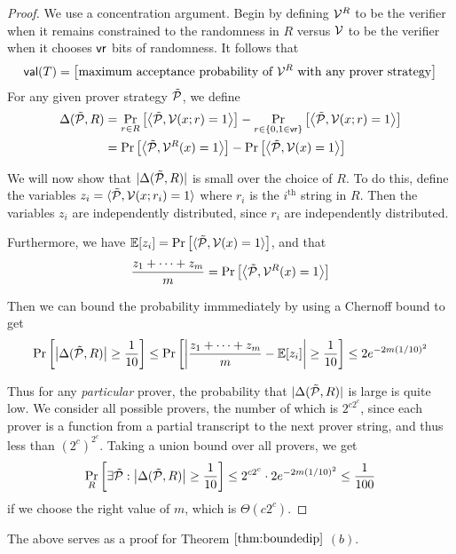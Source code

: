 \begin{proof}
	We use a concentration argument. Begin by defining $\mathcal{V}^R$ to be the verifier when it remains constrained to the randomness in $R$ versus $\mathcal{V}$ to be the verifier when it chooses $\mathsf{vr}$ bits of randomness. It follows that 
	$$\mathsf{val}(T)=\left[\text{maximum acceptance probability of $\mathcal{V}^R$ with any prover strategy}\right]$$
	For any given prover strategy $\tilde{\mathcal{P}}$, we define
	\begin{align*}
		\Delta(\tilde{\mathcal{P}},R)&=\Pr_{r\in R}\left[\left\langle\tilde{\mathcal{P}},\mathcal{V}(x;r)=1\right\rangle\right]-\Pr_{r\in \{0,1\in\mathsf{vr}\}}\left[\left\langle\tilde{\mathcal{P}},\mathcal{V}(x;r)=1\right\rangle\right]\\
		&=\Pr\left[\left\langle\tilde{\mathcal{P}},\mathcal{V}^R(x)=1\right\rangle\right]-\Pr\left[\left\langle\tilde{\mathcal{P}},\mathcal{V}(x)=1\right\rangle\right]
	\end{align*}

	We will now show that $|\Delta(\tilde{\mathcal{P}},R)|$ is small over the choice of $R$. To do this, define the variables $z_i=\langle\tilde{\mathcal{P}},\mathcal{V}(x;r_i)=1\rangle$ where $r_i$ is the $i^\text{th}$ string in $R$. Then the variables $z_i$ are independently distributed, since $r_i$ are independently distributed.
	
	Furthermore, we have $\mathbb{E}[z_i]=\Pr\left[\langle\tilde{\mathcal{P}},\mathcal{V}(x)=1\rangle\right]$, and that
	$$\frac{z_1+\dots+z_m}{m}=\Pr\left[\left\langle\tilde{\mathcal{P}},\mathcal{V}^R(x)=1\right\rangle\right]$$
	
	Then we can bound the probability immmediately by using a Chernoff bound to get
	$$\Pr\left[\left|\Delta(\tilde{\mathcal{P}},R)\right|\geq\frac{1}{10}\right]\leq\Pr\left[\left|\frac{z_1+\dots+z_m}{m}-\mathbb{E}[z_i]\right|\geq\frac{1}{10}\right]\leq2e^{-2m\left(1/10\right)^2}$$
	
	Thus for any \textit{particular} prover, the probability that $|\Delta(\tilde{\mathcal{P}},R)|$ is large is quite low. We consider all possible provers, the number of which is $2^{c2^c}$, since each prover is a function from a partial transcript to the next prover string, and thus less than $(2^c)^{2^c}$. Taking a union bound over all provers, we get
	$$\Pr_R\left[\exists\tilde{\mathcal{P}}:\left|\Delta(\tilde{\mathcal{P}},R)\right|\geq\frac{1}{10}\right]\leq 2^{c2^c}\cdot2e^{-2m\left(1/10\right)^2}\leq\frac{1}{100}$$
	if we choose the right value of $m$, which is $\Theta(c2^c)$.
\end{proof}

The above serves as a proof for Theorem $\ref{thm:boundedip}$ $(b)$.

